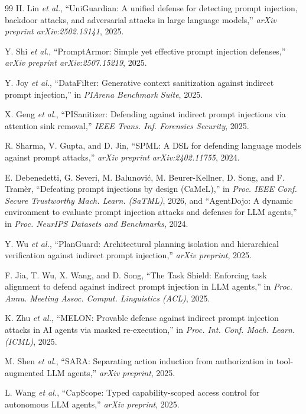 \documentclass[conference]{IEEEtran}
\begin{document}
\begin{thebibliography}{99}
 H. Lin \emph{et al.}, ``UniGuardian: A unified defense for detecting prompt injection, backdoor attacks, and adversarial attacks in large language models,'' \emph{arXiv preprint arXiv:2502.13141}, 2025.

 Y. Shi \emph{et al.}, ``PromptArmor: Simple yet effective prompt injection defenses,'' \emph{arXiv preprint arXiv:2507.15219}, 2025.

 Y. Joy \emph{et al.}, ``DataFilter: Generative context sanitization against indirect prompt injection,'' in \emph{PIArena Benchmark Suite}, 2025.

 X. Geng \emph{et al.}, ``PISanitizer: Defending against indirect prompt injections via attention sink removal,'' \emph{IEEE Trans. Inf. Forensics Security}, 2025.

 R. Sharma, V. Gupta, and D. Jin, ``SPML: A DSL for defending language models against prompt attacks,'' \emph{arXiv preprint arXiv:2402.11755}, 2024.

 E. Debenedetti, G. Severi, M. Balunovi{\'c}, M. Beurer-Kellner, D. Song, and F. Tram{\`e}r, ``Defeating prompt injections by design (CaMeL),'' in \emph{Proc. IEEE Conf. Secure Trustworthy Mach. Learn. (SaTML)}, 2026, and ``AgentDojo: A dynamic environment to evaluate prompt injection attacks and defenses for LLM agents,'' in \emph{Proc. NeurIPS Datasets and Benchmarks}, 2024.

 Y. Wu \emph{et al.}, ``PlanGuard: Architectural planning isolation and hierarchical verification against indirect prompt injection,'' \emph{arXiv preprint}, 2025.

 F. Jia, T. Wu, X. Wang, and D. Song, ``The Task Shield: Enforcing task alignment to defend against indirect prompt injection in LLM agents,'' in \emph{Proc. Annu. Meeting Assoc. Comput. Linguistics (ACL)}, 2025.

 K. Zhu \emph{et al.}, ``MELON: Provable defense against indirect prompt injection attacks in AI agents via masked re-execution,'' in \emph{Proc. Int. Conf. Mach. Learn. (ICML)}, 2025.

 M. Shen \emph{et al.}, ``SARA: Separating action induction from authorization in tool-augmented LLM agents,'' \emph{arXiv preprint}, 2025.

 L. Wang \emph{et al.}, ``CapScope: Typed capability-scoped access control for autonomous LLM agents,'' \emph{arXiv preprint}, 2025.


\end{thebibliography}
\end{document}
